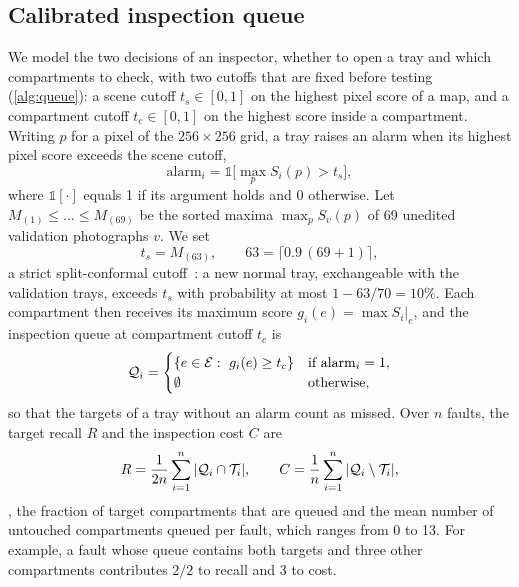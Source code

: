 \subsection{Calibrated inspection queue}
\label{sec:queue}
We model the two decisions of an inspector, whether to open a tray and which compartments to check, with two cutoffs that are fixed before testing (\cref{alg:queue}): a scene cutoff $t_s\in[0,1]$ on the highest pixel score of a map, and a compartment cutoff $t_c\in[0,1]$ on the highest score inside a compartment. Writing $p$ for a pixel of the $256{\times}256$ grid, a tray raises an alarm when its highest pixel score exceeds the scene cutoff,
\begin{equation}
 \mathrm{alarm}_i=\mathbb{1}\bigl[\max_p S_i(p)>t_s\bigr],
 \label{eq:alarm}
\end{equation}
where $\mathbb{1}[\cdot]$ equals 1 if its argument holds and 0 otherwise. Let $M_{(1)}\le\dots\le M_{(69)}$ be the sorted maxima $\max_p S_v(p)$ of 69 unedited validation photographs $v$. We set
\begin{equation}
 t_s=M_{(63)},\qquad 63=\lceil 0.9\,(69+1)\rceil,
 \label{eq:ts}
\end{equation}
a strict split-conformal cutoff~\cite{bates2023}: a new normal tray, exchangeable with the validation trays, exceeds $t_s$ with probability at most $1-63/70=10\%$. Each compartment then receives its maximum score $g_i(e)=\max S_i|_e$, and the inspection queue at compartment cutoff $t_c$ is
\begin{equation}
 \mathcal{Q}_i=\begin{cases}\{e\in\mathcal{E}:\ g_i(e)\ge t_c\} & \text{if }\mathrm{alarm}_i=1,\\ \emptyset & \text{otherwise,}\end{cases}
 \label{eq:queue}
\end{equation}
so that the targets of a tray without an alarm count as missed. Over $n$ faults, the target recall $R$ and the inspection cost $C$ are
\begin{equation}
 R=\frac{1}{2n}\sum_{i=1}^n|\mathcal{Q}_i\cap\mathcal{T}_i|,\qquad
 C=\frac{1}{n}\sum_{i=1}^n|\mathcal{Q}_i\setminus\mathcal{T}_i|,
 \label{eq:rc}
\end{equation}
\ie, the fraction of target compartments that are queued and the mean number of untouched compartments queued per fault, which ranges from 0 to 13. For example, a fault whose queue contains both targets and three other compartments contributes $2/2$ to recall and $3$ to cost.

